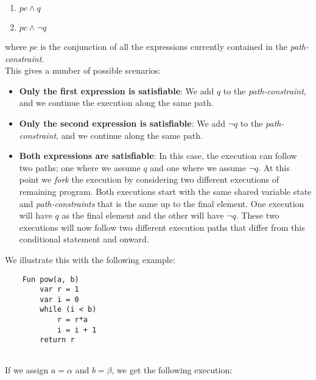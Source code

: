 		\begin{enumerate}
			\item $ pc \land q$
			\item $ pc \land \neg q$
		\end{enumerate}	
		where $pc$ is the conjunction of all the expressions currently contained in the \emph{path-constraint}.
		\\
		This gives a number of possible scenarios:	
		\begin{itemize}
			\item \textbf{Only the first expression is satisfiable}: 
			We add $q$ to the \emph{path-constraint}, and we continue the execution along the same path.
			\item \textbf{Only the second expression is satisfiable}:
			We add $\neg q$ to the \emph{path-constraint}, and we continue along the same path. 
			\item \textbf{Both expressions are satisfiable}: In this case, the execution can follow two paths; one where we assume $q$ and one where we assume $\neg q$. At this point we \emph{fork} the execution by considering two different executions of remaining program. Both executions start with the same shared variable state and \emph{path-constraints} that is the same
			 up to the final element. One execution will have $q$ as the final element and the other will have $\neg q$. 
			These two executions will now follow two different execution paths that differ from this conditional statement and onward.
		\end{itemize}
		
		We illustrate this with the following example:
		
	\begin{lstlisting}
	Fun pow(a, b) 
		var r = 1
		var i = 0
		while (i < b) 
			r = r*a
			i = i + 1 
		return r
		
		\end{lstlisting}
		
		If we assign $a = \alpha$ and $b = \beta$, we get the following execution:
		
